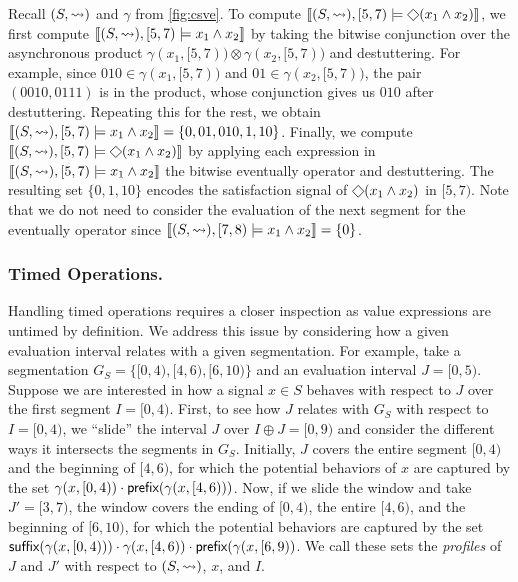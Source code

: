 \begin{example}
	Recall $(S, {\rightsquigarrow})$ and $\gamma$ from \cref{fig:csve}.
	To compute $\llbracket (S, {\hb}), [5,7) \models \LTLeventually(x_1 \land x_2) \rrbracket$, we first compute $\llbracket (S, {\rightsquigarrow}), [5,7) \models x_1 \land x_2 \rrbracket$ by taking the bitwise conjunction over the asynchronous product $\gamma(x_1, [5,7)) \otimes \gamma(x_2, [5,7))$ and destuttering.
	For example, since $010 \in \gamma(x_1, [5,7))$ and $01 \in \gamma(x_2, [5,7))$, the pair $(0010,0111)$ is in the product, whose conjunction gives us $010$ after destuttering. 
	Repeating this for the rest, we obtain $\llbracket (S, {\rightsquigarrow}), [5,7) \models x_1 \land x_2 \rrbracket = \{ 0, 01, 010, 1, 10 \}$.
	Finally, we compute $\llbracket (S, {\hb}), [5,7) \models \LTLeventually(x_1 \land x_2) \rrbracket$ by applying each expression in $\llbracket (S, {\rightsquigarrow}), [5,7) \models x_1 \land x_2 \rrbracket$ the bitwise eventually operator and destuttering.
	The resulting set $\{0, 1, 10\}$ encodes the satisfaction signal of $\LTLeventually(x_1 \land x_2)$ in $[5,7)$.
	Note that we do not need to consider the evaluation of the next segment for the eventually operator since $\llbracket (S, {\rightsquigarrow}), [7,8) \models x_1 \land x_2 \rrbracket = \{0\}$.
\end{example}

\subsubsection{Timed Operations.}
Handling timed operations requires a closer inspection as value expressions are untimed by definition.
We address this issue by considering how a given evaluation interval relates with a given segmentation.
For example, take a segmentation $G_S = \{ [0,4), [4,6), [6,10) \}$ and an evaluation interval $J = [0,5)$.
Suppose we are interested in how a signal $x \in S$ behaves with respect to $J$ over the first segment $I = [0,4)$.
First, to see how $J$ relates with $G_S$ with respect to $I =[0,4)$, we  ``slide'' the interval $J$ over $I \oplus J = [0,9)$ and consider the different ways it intersects the segments in $G_S$.
Initially, $J$ covers the entire segment $[0,4)$ and the beginning of $[4,6)$, for which the potential behaviors of $x$ are captured by the set $\gamma(x, [0,4)) \cdot \textsf{prefix}(\gamma(x, [4,6)))$.
Now, if we slide the window and take $J' = [3,7)$, the window covers the ending of $[0,4)$, the entire $[4,6)$, and the beginning of $[6,10)$, for which the potential behaviors are captured by the set $\textsf{suffix}(\gamma(x, [0,4))) \cdot \gamma(x, [4,6)) \cdot \textsf{prefix}(\gamma(x, [6,9))$.
We call these sets the \emph{profiles} of $J$ and $J'$ with respect to $(S,{\rightsquigarrow})$, $x$, and $I$.

